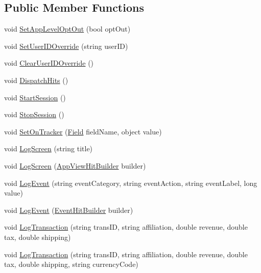 \subsection*{Public Member Functions}
\begin{DoxyCompactItemize}
\item 
void \hyperlink{class_google_analytics_v4_aa7cf5f1f2b35c21f7f5257df6d016479}{Set\+App\+Level\+Opt\+Out} (bool opt\+Out)
\item 
void \hyperlink{class_google_analytics_v4_ace31167ab3826c152ec6662c6cae1115}{Set\+User\+I\+D\+Override} (string user\+ID)
\item 
void \hyperlink{class_google_analytics_v4_addf9e233891152323b0ea5062fd8cace}{Clear\+User\+I\+D\+Override} ()
\item 
void \hyperlink{class_google_analytics_v4_a3adbcab13c9826a5b887f481cd174a94}{Dispatch\+Hits} ()
\item 
void \hyperlink{class_google_analytics_v4_ae0de0ad52c4568e64c3e4a6330cbf5fe}{Start\+Session} ()
\item 
void \hyperlink{class_google_analytics_v4_a768198aaf38cbb89d965fffca309dac5}{Stop\+Session} ()
\item 
void \hyperlink{class_google_analytics_v4_ad4c84db08e7276957d541c79cea8afde}{Set\+On\+Tracker} (\hyperlink{class_field}{Field} field\+Name, object value)
\item 
void \hyperlink{class_google_analytics_v4_a65d8b909078c65dce4555ca37357b27c}{Log\+Screen} (string title)
\item 
void \hyperlink{class_google_analytics_v4_a33b365f78d998fb7fa93c3c98862f744}{Log\+Screen} (\hyperlink{class_app_view_hit_builder}{App\+View\+Hit\+Builder} builder)
\item 
void \hyperlink{class_google_analytics_v4_a98e6990ad085cef4d3f5bf34e84bed13}{Log\+Event} (string event\+Category, string event\+Action, string event\+Label, long value)
\item 
void \hyperlink{class_google_analytics_v4_a1166a346068b06b75effe702b1f8bf7c}{Log\+Event} (\hyperlink{class_event_hit_builder}{Event\+Hit\+Builder} builder)
\item 
void \hyperlink{class_google_analytics_v4_ac0af13f05446b90f661aac9fcf3b0198}{Log\+Transaction} (string trans\+ID, string affiliation, double revenue, double tax, double shipping)
\item 
void \hyperlink{class_google_analytics_v4_ab789456e532664b260eaa18d9cef0ad6}{Log\+Transaction} (string trans\+ID, string affiliation, double revenue, double tax, double shipping, string currency\+Code)

\end{DoxyCompactItemize}
